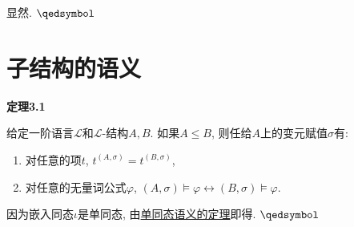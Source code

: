 \documentclass[UTF8]{ctexart}
\begin{document}
 显然. \hfill $\qedsymbol$

\vspace{20pt}





\section{子结构的语义}

\hypertarget{sec:定理3.1}{}
\noindent\textbf{定理3.1}

给定一阶语言$\mathcal{L}$和$\mathcal{L}$-结构$A,B$.
如果$A\leqslant B$, 则任给$A$上的变元赋值$\sigma$有:
\begin{enumerate}
    \item 对任意的项$t$, $t^{(A,\sigma)}=t^{(B,\sigma)}$,
    \item 对任意的无量词公式$\varphi$,
    $(A,\sigma)\models\varphi\leftrightarrow(B,\sigma)\models\varphi$.
\end{enumerate}


因为嵌入同态$\iota$是单同态, 由\href{02 结构的同态#nameddest=sec:定理3.3}
{单同态语义的定理}即得. \hfill $\qedsymbol$
\end{document}
